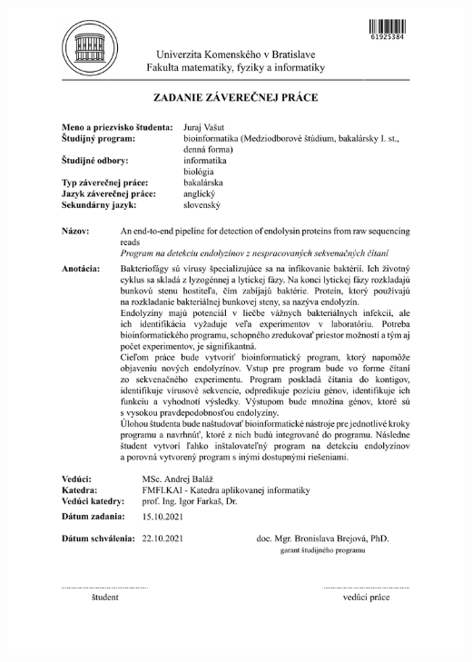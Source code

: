 \documentclass[12pt, twoside]{book}
\begin{document}
\newpage 
\thispagestyle{empty}
\hspace{-2cm}\includegraphics[width=1.1\textwidth]{images/zadanie}
\end{document}
